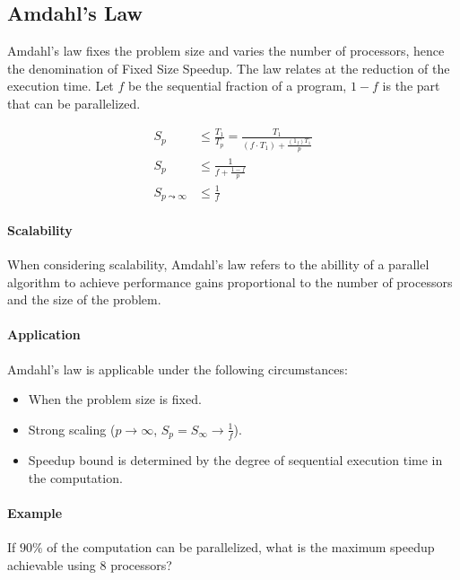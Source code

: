 \subsection{Amdahl's Law}

Amdahl's law fixes the problem size and varies the number of processors,
hence the denomination of Fixed Size Speedup.
The law relates at the reduction of the execution time.
Let $f$ be the sequential fraction of a program, $1-f$ is the part that can be parallelized.

\begin{equation}
    \begin{split}
        S_p & \le \frac{T_1}{T_p} = \frac{T_1}{(f \cdot T_1) + \frac{(1_f)T_1}{p}}\\
        S_p & \le \frac{1}{f + \frac{1-f}{p}}\\
        S_{p \leadsto \infty} & \le \frac{1}{f}
    \end{split}
\end{equation}

\paragraph{Scalability}
When considering scalability, Amdahl's law refers to the abillity of a parallel algorithm to achieve performance gains proportional to the number of processors and the size of the problem.

\paragraph{Application}

Amdahl's law is applicable under the following circumstances:
\begin{itemize}
    \item When the problem size is fixed.
    \item Strong scaling ($p\rightarrow\infty$, $S_p = S_{\infty} \rightarrow \frac{1}{f}$).
    \item Speedup bound is determined by the degree of sequential execution time in the computation.
\end{itemize}

\paragraph{Example}

If $90\%$ of the computation can be parallelized, what is the maximum speedup achievable using 8 processors?

